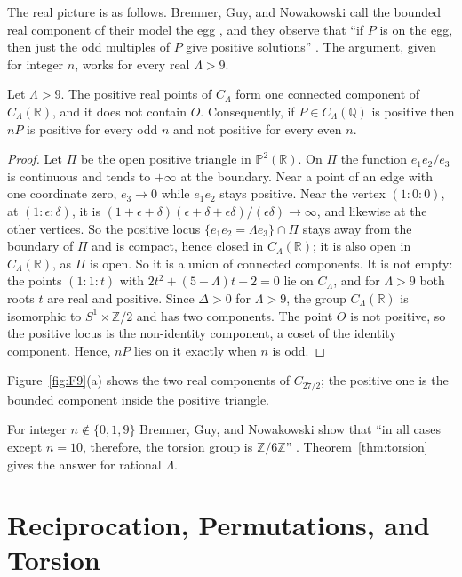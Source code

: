 \documentclass[10pt]{article}
\newcommand{\Q}{\mathbb{Q}}
\newcommand{\R}{\mathbb{R}}
\newcommand{\Z}{\mathbb{Z}}
\newcommand{\PP}{\mathbb{P}}
\begin{document}
The real picture is as follows. Bremner, Guy, and Nowakowski call the bounded real component of their model the egg \cite[p.~118]{bgn1993}, and they observe that ``if $P$ is on the egg, then just the odd multiples of $P$ give positive solutions'' \cite[p.~119]{bgn1993}. The argument, given for integer $n$, works for every real $\Lambda>9$.

\begin{lemma}\label{lem:egg}
Let $\Lambda>9$. The positive real points of $C_\Lambda$ form one connected component of $C_\Lambda(\R)$, and it does not contain $O$. Consequently, if $P\in C_\Lambda(\Q)$ is positive then $nP$ is positive for every odd $n$ and not positive for every even $n$.
\end{lemma}

\begin{proof}
Let $\Pi$ be the open positive triangle in $\PP^2(\R)$. On $\Pi$ the function $e_1e_2/e_3$ is continuous and tends to $+\infty$ at the boundary. Near a point of an edge with one coordinate zero, $e_3\to0$ while $e_1e_2$ stays positive. Near the vertex $(1:0:0)$, at $(1:\epsilon:\delta)$, it is $(1+\epsilon+\delta)(\epsilon+\delta+\epsilon\delta)/(\epsilon\delta)\to\infty$, and likewise at the other vertices. So the positive locus $\{e_1e_2=\Lambda e_3\}\cap\Pi$ stays away from the boundary of $\Pi$ and is compact, hence closed in $C_\Lambda(\R)$; it is also open in $C_\Lambda(\R)$, as $\Pi$ is open. So it is a union of connected components. It is not empty: the points $(1:1:t)$ with $2t^2+(5-\Lambda)t+2=0$ lie on $C_\Lambda$, and for $\Lambda>9$ both roots $t$ are real and positive. Since $\Delta>0$ for $\Lambda>9$, the group $C_\Lambda(\R)$ is isomorphic to $S^1\times\Z/2$ and has two components. The point $O$ is not positive, so the positive locus is the non-identity component, a coset of the identity component. Hence, $nP$ lies on it exactly when $n$ is odd.
\end{proof}

Figure~\ref{fig:F9}(a) shows the two real components of $C_{27/2}$; the positive one is the bounded component inside the positive triangle.

For integer $n\notin\{0,1,9\}$ Bremner, Guy, and Nowakowski show that ``in all cases except $n=10$, therefore, the torsion group is $\Z/6\Z$'' \cite[\S4, p.~120]{bgn1993}. Theorem~\ref{thm:torsion} gives the answer for rational $\Lambda$.

\section{Reciprocation, Permutations, and Torsion}\label{sec:dual}
\end{document}
